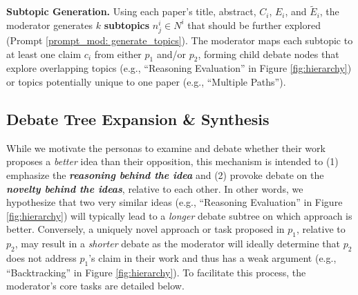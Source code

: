 \par{\textbf{Subtopic Generation.}} Using each paper's title, abstract, $C_i$, $E_i$, and $\widetilde{E}_i$, the moderator generates $k$ \textbf{subtopics} $n^i_j \in N^i$ that should be further explored (Prompt \ref{prompt_mod: generate_topics}). The moderator maps each subtopic to at least one claim $c_i$ from either $p_1$ and/or $p_2$, forming child debate nodes that explore overlapping topics (e.g., ``Reasoning Evaluation'' in Figure \ref{fig:hierarchy}) or topics potentially unique to one paper (e.g., ``Multiple Paths'').

\subsection{Debate Tree Expansion \& Synthesis}
\label{sec:expansion}

\par While we motivate the personas to examine and debate whether their work proposes a \textit{better} idea than their opposition, this mechanism is intended to (1) emphasize the \textbf{\textit{reasoning behind the idea}} and (2) provoke debate on the \textbf{\textit{novelty behind the ideas}}, relative to each other. In other words, we hypothesize that two very similar ideas (e.g., ``Reasoning Evaluation'' in Figure \ref{fig:hierarchy}) will typically lead to a \textit{longer} debate subtree on which approach is better. Conversely, a uniquely novel approach or task proposed in $p_1$, relative to $p_2$, may result in a \textit{shorter} debate as the moderator will ideally determine that $p_2$ does not address $p_1$'s claim in their work and thus has a weak argument (e.g., ``Backtracking'' in Figure \ref{fig:hierarchy}). To facilitate this process, the moderator's core tasks are detailed below.

